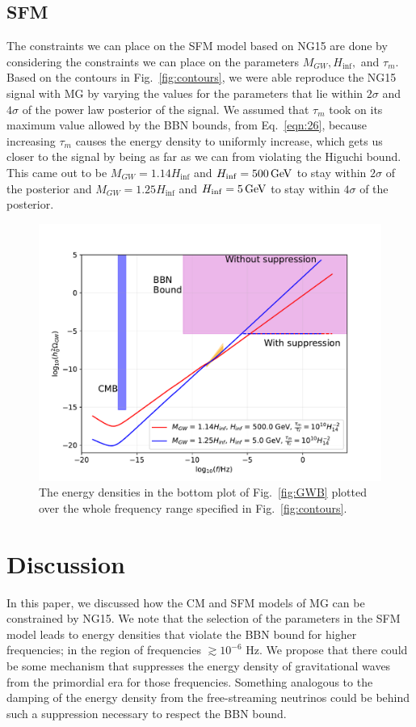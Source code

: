 \documentclass[prd,twocolumn,aps,psfig,nofootinbib,nobibnotes,superscriptaddress,preprintnumbers,times]{revtex4-2}
\newcommand{\GeV}{\,{\rm GeV}}
\begin{document}
\subsection{SFM}

The constraints we can place on the SFM model based on NG15 are done by considering the constraints we can place on the parameters $M_{GW}, H_{\inf},$ and $\tau_m$. Based on the contours in Fig.\ \ref{fig:contours}, we were able reproduce the NG15 signal with MG by varying the values for the parameters that lie within $2\sigma$ and $4\sigma$ of the power law posterior of the signal. We assumed that $\tau_m$ took on its maximum value allowed by the BBN bounds, from Eq.\ \ref{eqn:26}, because increasing $\tau_m$ causes the energy density to uniformly increase, which gets us closer to the signal by being as far as we can from violating the Higuchi bound. This came out to be $M_{GW} = 1.14H_{\inf}$ and $H_{\inf} = 500 \GeV$ to stay within $2\sigma$ of the posterior and $M_{GW} = 1.25H_{\inf}$ and $H_{\inf} = 5 \GeV$ to stay within $4\sigma$ of the posterior. 
\begin{figure}[h]
\includegraphics[width=\linewidth]{fig/fig7.pdf}
\caption{The energy densities in the bottom plot of Fig.\ \ref{fig:GWB} plotted over the whole frequency range specified in Fig.\ \ref{fig:contours}.}
\label{fig:bound}
\end{figure}
\section{Discussion}
In this paper, we discussed how the CM and SFM models of MG can be constrained by NG15. We note that the selection of the parameters in the SFM model leads to energy densities that violate the BBN bound for higher frequencies; in the region of frequencies $\gtrsim 10^{-6}$ Hz. We propose that there could be some mechanism that suppresses the energy density of gravitational waves from the primordial era for those frequencies. Something analogous to the damping of the energy density from the free-streaming neutrinos \cite{Weinberg:2004} could be behind such a suppression necessary to respect the BBN bound. 
\end{document}
